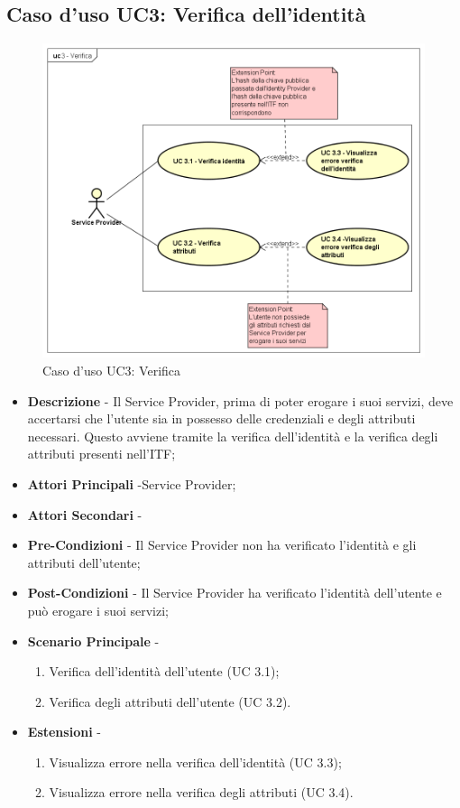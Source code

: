 \subsection{Caso d'uso UC3: Verifica dell'identità}
\begin{figure}[h]
	\centering
	\includegraphics[scale=0.50]{immagini/usecase/UC3_Verifica}
	\caption{Caso d'uso UC3: Verifica}
\end{figure}
\begin{itemize}
	\item \textbf{Descrizione} - Il Service Provider, prima di poter erogare i suoi servizi, deve accertarsi che l'utente sia in possesso delle credenziali e degli attributi necessari. Questo avviene tramite la verifica dell'identità e la verifica degli attributi presenti nell'\gls{ITF};
	\item \textbf{Attori Principali} -Service Provider;
	\item \textbf{Attori Secondari} -
	\item \textbf{Pre-Condizioni} - Il Service Provider non ha verificato l'identità e gli attributi dell'utente;
	\item \textbf{Post-Condizioni} - Il Service Provider ha verificato l'identità dell'utente e può erogare i suoi servizi;
	\item \textbf{Scenario Principale} -
	\begin{enumerate}
		\item Verifica dell'identità dell'utente (UC 3.1);
		\item Verifica degli attributi dell'utente (UC 3.2).
	\end{enumerate}
	\item \textbf{Estensioni} -
	\begin{enumerate}
		\item Visualizza errore nella verifica dell'identità (UC 3.3);
		\item Visualizza errore nella verifica degli attributi (UC 3.4).
	\end{enumerate}
\end{itemize}
